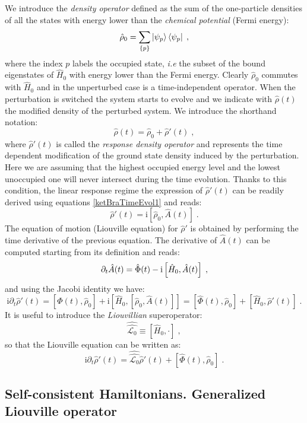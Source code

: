 \documentclass[a4paper]{article}
\renewcommand{\d}{\partial}
\newcommand{\ii}{\mathrm{i}}
\newcommand{\be}{\begin{equation}}
\newcommand{\ee}{\end{equation}}
\newcommand{\nn}{\notag}
\newcommand{\lb}{\label}
\newcommand{\op}[1]{\hat {#1}}
\newcommand{\sop}[1]{\op{\op {#1}}}
\newcommand{\commutator}[2]{\left[ {#1} , {#2} \right]}
\newcommand{\dmnot}{\op{\rho}_0}
\newcommand{\dm}{\op{\rho}}
\newcommand{\hnot}{\op{H}_0}
\newcommand{\Liouvnot}{\sop{\mathcal L_0}}
\begin{document}
We introduce the \emph{density operator} defined as the sum of the one-particle densities of all the states with energy lower than the \emph{chemical potential} 
(Fermi energy):
\be\label{rhodef1}
\dmnot = \sum_{\{p\}} \ket{\psi_p} \bra{\psi_p}  \;,
\ee
where the index $p$ labels the occupied state, \emph{i.e} the subset of the bound eigenstates of $\hnot$ with energy lower than the Fermi energy.
Clearly $\dmnot$ commutes with $\hnot$ and in the unperturbed case is a time-independent operator. When the perturbation is switched the system starts to evolve
and we indicate with $\dm(t)$ the modified density of the perturbed system. We introduce the shorthand notation:
\be\lb{rhodef2}
\dm(t)  =  \dmnot + \dm'(t)\;,
\ee
where $\dm'(t)$ is called the \emph{response density operator} and represents the time dependent modification of the ground state density induced by the perturbation.
Here we are assuming that the highest occupied energy level and the lowest unoccupied one will never intersect during the time evolution. Thanks to this condition, the 
linear response regime the expression of $\dm'(t)$ can be readily derived using equations \eqref{ketBraTimeEvol1} and reads:  
\be\lb{rhoTimeEvolutionDef3}
\dm'(t) = \ii \commutator{\dmnot}{\op A(t)} \;.
\ee
The equation of motion (Liouville equation) for $\dm'$ is obtained by performing the time derivative of the previous equation. The derivative of $\op A(t)$ can be 
computed starting from its definition and reads:
\be
\d_t\op A(t) = \op\Phi(t) -\ii \commutator{\hnot}{\op A(t)} \nn \;,
\ee
and using the Jacobi identity we have:
\be\lb{LiouvilleRhoDef1}
\ii \d_t \dm'(t) = \commutator{\op\Phi(t)}{\dmnot} + \ii\commutator{\hnot}{\commutator{\dmnot}{\op A(t)}} = 
\commutator{\op\Phi(t)}{\dmnot} + \commutator{\hnot}{\dm'(t)} \;.
\ee
It is useful to introduce the \emph{Liouvillian} superoperator:
\be\lb{L0sopDef1}
\Liouvnot \equiv \commutator{\hnot}{\cdot} \;,
\ee
so that the Liouville equation can be written as:
\be\lb{LiouvilleRhoDef2}
\ii \d_t \dm'(t) = \Liouvnot \dm'(t) + \commutator{\op\Phi(t)}{\dmnot} \;.
\ee

\subsection{Self-consistent Hamiltonians. Generalized Liouville operator}
\end{document}
